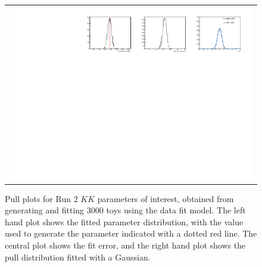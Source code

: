 \begin{figure}
\begin{tabular}{c}
\includegraphics[width=\textwidth]{ANA_resources/Plots/Data_fit/FitterBias//N_Bs_KK_run2.pdf} \\
  \end{tabular}
  \caption{Pull plots for Run 2 $KK$ parameters of interest, obtained from generating and fitting 3000 toys using the data fit model. The left hand plot shows the fitted parameter distribution, with the value used to generate the parameter indicated with a dotted red line. The central plot shows the fit error, and the right hand plot shows the pull distribution fitted with a Gaussian.}
\label{fig:KK_run2_pulls}
\end{figure}
